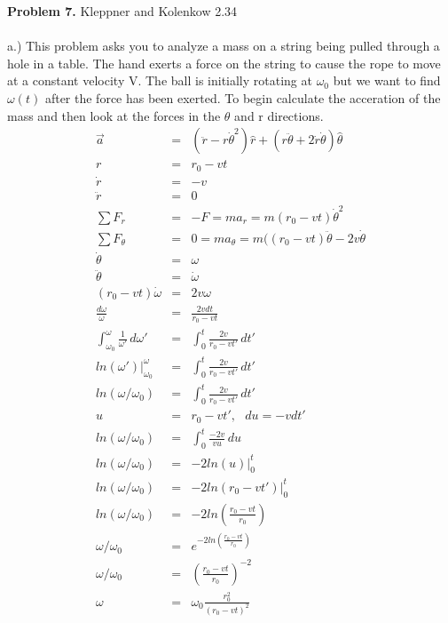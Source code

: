 \documentclass[11pt]{amsart}
\begin{document}
\textbf{Problem 7.} Kleppner and Kolenkow 2.34 \\ \\
a.) This problem asks you to analyze a mass on a string being pulled through a hole in a table. The hand exerts a force on the string to cause the rope to move at a constant velocity V. The ball is initially rotating at $\omega_{0}$ but we want to find $\omega(t)$ after the force has been exerted. To begin calculate the acceration of the mass and then look at the forces in the $\theta$ and r directions. \\
\begin{eqnarray*}
\vec{a} &=& (\ddot{r}-r\dot{\theta}^{2})\hat{r} + (r\ddot{\theta}+2\dot{r}\dot{\theta})\hat{\theta} \\
r &=& r_{0} -vt \\
\dot{r} &=& -v \\
\ddot{r} &=& 0 \\
\sum{F_{r}} &=& -F = ma_{r} = m(r_{0}-vt)\dot{\theta}^{2}\\
\sum{F_{\theta}} &=& 0 = ma_{\theta} = m((r_{0}-vt)\ddot{\theta}-2v\dot{\theta} \\
\dot{\theta} &=& \omega \\
\ddot{\theta} &=& \dot{\omega} \\
(r_{0}-vt)\dot{\omega} &=& 2v\omega \\
\frac{d\omega}{\omega} &=&\frac{2vdt}{r_{0}-vt} \\
\int^{\omega}_{\omega_{0}}\frac{1}{\omega'}\,d\omega' &=& \int^{t}_{0}\frac{2v}{r_{0}-vt'}\,dt' \\
ln(\omega')|^{\omega}_{\omega_{0}} &=& \int^{t}_{0}\frac{2v}{r_{0}-vt'}\,dt' \\
ln(\omega/\omega_{0}) &=& \int^{t}_{0}\frac{2v}{r_{0}-vt'}\,dt' \\ 
u &=& r_{0}-vt',\mbox{ }du=-vdt' \\
ln(\omega/\omega_{0}) &=& \int^{t}_{0}\frac{-2v}{vu}\,du \\
ln(\omega/\omega_{0}) &=& -2ln(u)|^{t}_{0}  \\
ln(\omega/\omega_{0}) &=& -2ln(r_{0}-vt')|^{t}_{0}  \\
ln(\omega/\omega_{0}) &=& -2ln(\frac{r_{0}-vt}{r_{0}})  \\
\omega/\omega_{0} &=& e^{-2ln(\frac{r_{0}-vt}{r_{0}})} \\
\omega/\omega_{0} &=& (\frac{r_{0}-vt}{r_{0}})^{-2} \\
\omega &=& \omega_{0}\frac{r_{0}^{2}}{(r_{0}-vt)^{2}} 
\end{eqnarray*} \\
\end{document}
